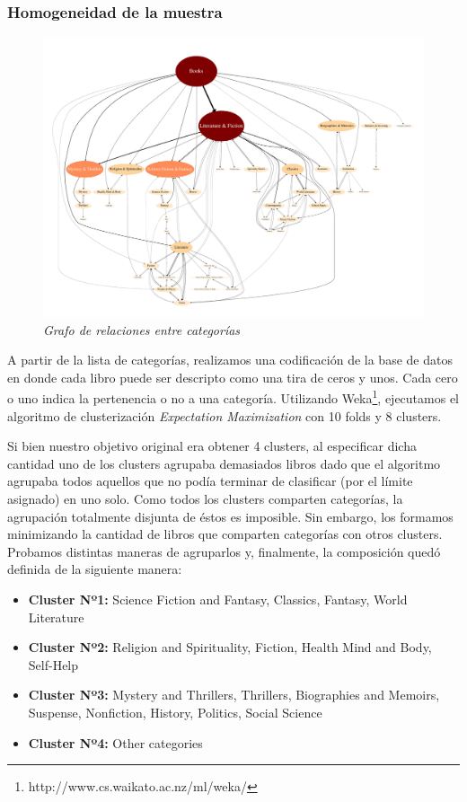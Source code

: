 \documentclass[12pt,journal,compsoc]{IEEEtran}
\begin{document}
\subsubsection{Homogeneidad de la muestra}

\begin{figure}[H]
  \centering
  \includegraphics[width=8in]{../results/graph.pdf}
  \caption{\small \textit{Grafo de relaciones entre categorías}}
  \label{fig:jerarquizacionDeCategorias}  
\end{figure}

A partir de la lista de categorías, realizamos una codificación de la base de datos en donde cada libro puede ser descripto como una tira de ceros y unos. Cada cero o uno indica la pertenencia o no a una categoría. Utilizando Weka\footnote{http://www.cs.waikato.ac.nz/ml/weka/}, ejecutamos el algoritmo de clusterización \textit{Expectation Maximization} con 10 folds y 8 clusters. 

Si bien nuestro objetivo original era obtener 4 clusters, al especificar dicha cantidad uno de los clusters agrupaba demasiados libros dado que el algoritmo agrupaba todos aquellos que no podía terminar de clasificar (por el límite asignado) en uno solo. Como todos los clusters comparten categorías, la agrupación totalmente disjunta de éstos es imposible. Sin embargo, los formamos minimizando la cantidad de libros que comparten categorías con otros clusters. Probamos distintas maneras de agruparlos y, finalmente, la composición quedó definida de la siguiente manera:\\

\begin{itemize}
\item \textbf{Cluster Nº1:} Science Fiction and Fantasy, Classics, Fantasy, World Literature
\item \textbf{Cluster Nº2:} Religion and Spirituality, Fiction, Health Mind and Body, Self-Help
\item \textbf{Cluster Nº3:} Mystery and Thrillers, Thrillers, Biographies and Memoirs, Suspense, Nonfiction, History, Politics, Social Science
\item \textbf{Cluster Nº4:} Other categories
\end{itemize}
\end{document}
